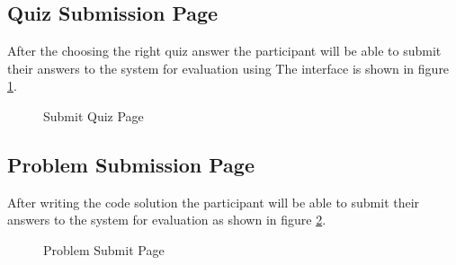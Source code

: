 \subsection{Quiz Submission Page}
After the choosing the right quiz answer the participant will be able to submit their
answers to the system for evaluation using The interface is shown in figure \ref{fig:submit_quiz}.

\begin{figure}
  \centering
  \setlength\fboxsep{0pt} %
  \setlength\fboxrule{2pt} %
  \caption{Submit Quiz Page}\label{fig:submit_quiz}
\end{figure}


\subsection{Problem Submission Page}
After writing the code solution the participant will be able to submit their
answers to the system for evaluation as shown in figure \ref{Problem Submit Page}.


\begin{figure}
  \centering
  \setlength\fboxsep{0pt} %
  \setlength\fboxrule{2pt} %
  \caption{Problem Submit Page}\label{Problem Submit Page}
\end{figure}

